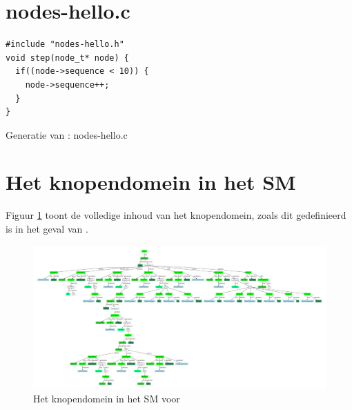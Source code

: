 \section{nodes-hello.c}
\vspace{-5mm}
\begin{listing}[H]
  \begin{verbatim}
#include "nodes-hello.h"
void step(node_t* node) {
  if((node->sequence < 10)) {
    node->sequence++;
  }
}
  \end{verbatim}
  \vspace{-5mm}
  \caption{Generatie van : nodes-hello.c}
\end{listing}

\section{Het knopendomein in het SM}
\label{section:nodes.sm}

Figuur \ref{fig:nodes.sm} toont de volledige inhoud van het knopendomein, zoals
dit gedefinieerd is in het geval van .

\begin{figure}[H]
  \centering
  \includegraphics[angle=90,width=0.7\linewidth]{resources/nodes_sm.pdf}
  \caption{Het knopendomein in het SM voor  }
  \label{fig:nodes.sm}
\end{figure}

